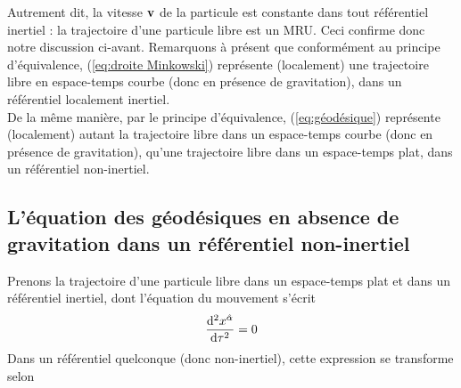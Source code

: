Autrement dit, la vitesse $\bm{\mathrm{v}}$ de la particule est constante dans tout référentiel inertiel : la trajectoire d'une particule libre est un MRU. Ceci confirme donc notre discussion ci-avant. Remarquons à présent que conformément au principe d'équivalence, (\ref{eq:droite Minkowski}) représente (localement) une trajectoire libre en espace-temps courbe (donc en présence de gravitation), dans un référentiel localement inertiel. \\
De la même manière, par le principe d'équivalence, (\ref{eq:géodésique}) représente (localement) autant la trajectoire libre dans un espace-temps courbe (donc en présence de gravitation), qu'une trajectoire libre dans un espace-temps plat, dans un référentiel non-inertiel.
\subsection{L'équation des géodésiques en absence de gravitation dans un référentiel non-inertiel}
Prenons la trajectoire d'une particule libre dans un espace-temps plat et dans un référentiel inertiel, dont l'équation du mouvement s'écrit 
\begin{equation*}
    \frac{\mathrm{d}^2x^{\hat{\alpha}}}{\mathrm{d}\tau^2} = 0
\end{equation*}
Dans un référentiel quelconque (donc non-inertiel), cette expression se transforme selon

